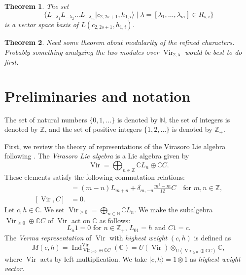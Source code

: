 \documentclass[a4paper, 12pt, reqno]{amsart}
\newtheorem{theorem}{Theorem}[section]
\theoremstyle{remark}
\DeclareMathOperator{\Vir}{Vir}
\DeclareMathOperator{\Ind}{Ind}
\begin{document}
\begin{theorem}
  \label{thr:2}
  The set
  \begin{equation*}
    \{L_{-\lambda_1}L_{-\lambda_2}\dots L_{-\lambda_m}|c_{2, 2s + 1}, h_{1, i}\rangle \mid \lambda = [\lambda_1, \dots, \lambda_m] \in R_{s, i}\}
  \end{equation*}
  is a vector space basis of $L(c_{2, 2s + 1}, h_{1, i})$. 
\end{theorem}

\begin{theorem}
  \label{thr:3}
  Need some theorem about modularity of the refined characters.
  Probably something analyzing the two modules over $\Vir_{2, 5}$ would be best to do first. 
\end{theorem}

\section{Preliminaries and notation}
\label{sec:prel-notat}

The set of natural numbers $\{0, 1, \dots\}$ is denoted by $\mathbb{N}$, the set of integers is denoted by $\mathbb{Z}$, and the set of positive integers $\{1, 2, \dots\}$ is denoted by $\mathbb{Z}_+$.

First, we review the theory of representations of the Virasoro Lie algebra following \cite{kac_bombay_2013}.
The \emph{Virasoro Lie algebra} is a Lie algebra given by
\begin{equation*}
  \Vir = \bigoplus_{n \in \mathbb{Z}}\mathbb{C}L_n \oplus \mathbb{C}C.
\end{equation*}
These elements satisfy the following commutation relations:
\begin{align*}
  [L_m, L_n] &= (m - n)L_{m + n} + \delta_{m, -n}\frac{m^3 - m}{12}C \quad \text{for $m, n \in \mathbb{Z}$}, \\
  [\Vir, C] &= 0.
\end{align*}
Let $c, h \in \mathbb{C}$.
We set $\Vir_{\ge 0} = \bigoplus_{n \in \mathbb{N}}\mathbb{C}L_n$.
We make the subalgebra $\Vir_{\ge 0} \oplus \mathbb{C}C$ of $\Vir$ act on $\mathbb{C}$ as follows:
\begin{equation*}
  \text{$L_n1 = 0$ for $n \in \mathbb{Z}_+$, $L_01 = h$ and $C1 = c$}.
\end{equation*}
The \emph{Verma representation} of $\Vir$ with \emph{highest weight} $(c, h)$ is defined as
\begin{equation*}
  M(c, h) = \Ind^{\Vir}_{\Vir_{\ge 0} \oplus \mathbb{C}C}(\mathbb{C}) = U(\Vir) \otimes_{U(\Vir_{\ge 0} \oplus \mathbb{C}C)} \mathbb{C},
\end{equation*}
where $\Vir$ acts by left multiplication.
We take $|c, h\rangle = 1 \otimes 1$ as \emph{highest weight vector}.
\end{document}
